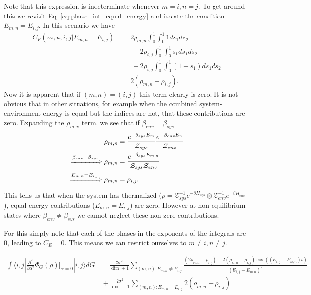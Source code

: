 \documentclass{article}
\newcommand{\ket}[1]{|#1\rangle}
\newcommand{\bra}[1]{\langle #1|}
\newcommand{\partfun}{\mathcal{Z}}
\begin{document}
Note that this expression is indeterminate whenever $m = i, n = j$. To get around this we revisit Eq. \eqref{eq:phase_int_equal_energy} and isolate the condition $E_{m,n} = E_{i,j}$. In this scenario we have
\begin{align}
    C_E(m,n;i,j | E_{m,n} = E_{i,j}) =&~ 2 \rho_{m,n} \int_0^1 \int_0^1 1 ds_1 ds_2 \nonumber \\
    &~ ~ - 2 \rho_{i,j} \int_0^1 \int_0^1 s_1 ds_1 ds_2 \nonumber \\
    &~ ~ - 2 \rho_{i,j} \int_0^1 \int_0^1 (1-s_1) ds_1 ds_2 \\
    =&~ 2 (\rho_{m,n} - \rho_{i,j}).
\end{align}
Now it is apparent that if $(m,n) = (i,j)$ this term clearly is zero. It is not obvious that in other situations, for example when the combined system-environment energy is equal but the indices are not, that these contributions are zero. Expanding the $\rho_{m,n}$ term, we see that if $\beta_{env} = \beta_{sys}$
\begin{align}
    \rho_{m,n} &= \frac{e^{-\beta_{sys} E_m}}{\partfun_{sys}} \frac{e^{-\beta_{env} E_{n}}}{\partfun_{env}} \\
    \xRightarrow{\beta_{env} = \beta_{sys}} \rho_{m,n} &= \frac{e^{-\beta_{sys}E_{m,n}}}{\partfun_{sys} \partfun_{env}} \\
    \xRightarrow{E_{m,n} = E_{i,j}} \rho_{m,n} &= \rho_{i,j}.
\end{align}
This tells us that when the system has thermalized ($\rho = \partfun_{sys}^{-1} e^{-\beta H_{sys}} \otimes \partfun_{env}^{-1} e^{-\beta H_{env}}$), equal energy contributions ($E_{m,n} = E_{i,j}$) are zero. However at non-equilibrium states where $\beta_{env} \neq \beta_{sys}$ we cannot neglect these non-zero contributions. 

For this simply note that each of the phases in the exponents of the integrals are 0, leading to $C_E = 0$. This means we can restrict ourselves to $m \neq i, n \neq j$. 

\begin{align}
    \int \bra{i,j} \frac{\partial^2}{\partial \alpha^2} \Phi_G(\rho) \bigg|_{\alpha = 0} \ket{i,j} dG &= \frac{2 \sigma^2}{\dim + 1} \sum_{(m,n) : E_{m,n} \neq E_{i,j}} \frac{(2 \rho_{m,n} - \rho_{i,j}) - 2(\rho_{m,n} - \rho_{i,j}) \cos ((E_{i,j} - E_{m,n})t)}{(E_{i,j} - E_{m,n})^2} \nonumber \\
    &~ + \frac{2 \sigma^2}{\dim + 1} \sum_{(m,n) : E_{m,n} = E_{i,j}} 2 (\rho_{m,n} - \rho_{i,j}) \label{eq:second_order_final}
\end{align}
\end{document}

